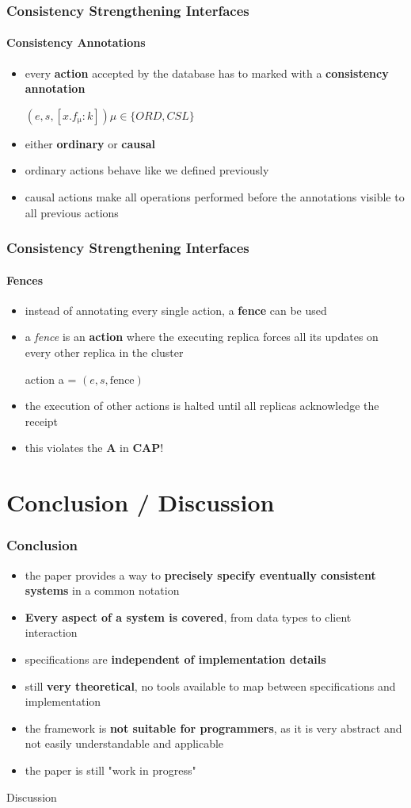 \documentclass[11pt]{beamer}
\begin{document}
\begin{frame}
\frametitle{Consistency Strengthening Interfaces}
\framesubtitle{Consistency Annotations}
\begin{itemize}
\item every \textbf{action} accepted by the database has to marked with a \textbf{consistency annotation}
\begin{center} \((e,s,[x.f\mathrm{_{\mu}}:k]) \mu \in \{ORD, CSL\}\)\end{center} 
\item either \textbf{ordinary} or \textbf{causal}
\item ordinary actions behave like we defined previously
\item causal actions make all operations performed before the annotations visible to all previous actions
\end{itemize}
\end{frame}

\begin{frame}
\frametitle{Consistency Strengthening Interfaces}
\framesubtitle{Fences}
\begin{itemize}
\item instead of annotating every single action, a \textbf{fence} can be used
\item a \textit{fence} is an \textbf{action} where the executing replica forces all its updates on every other replica in the cluster
\begin{center} action a =  \((e,s, \mathrm{fence})\)\end{center} 
\item the execution of other actions is halted until all replicas acknowledge the receipt
\pause
\item this violates the \textbf{A} in \textbf{CAP}!
\end{itemize}
\end{frame}

\section{Conclusion / Discussion}

\begin{frame}
\frametitle{Conclusion}
\begin{itemize}
\item<pro@1-> the paper provides a way to \textbf{precisely specify eventually consistent systems} in a common notation
\item<pro@1-> \textbf{Every aspect of a system is covered}, from data types to client interaction
\item<pro@1-> specifications are \textbf{independent of implementation details}
\item<con@1-> still \textbf{very theoretical}, no tools available to map between specifications and implementation 
\item<con@1-> the framework is \textbf{not suitable for programmers}, as it is very abstract and not easily understandable and applicable
\item<con@1-> the paper is still "work in progress"
\end{itemize}
\end{frame}

\begin{frame}
\begin{center}
\begin{Huge}
Discussion
\end{Huge}
\end{center}
\end{frame}
\end{document}
